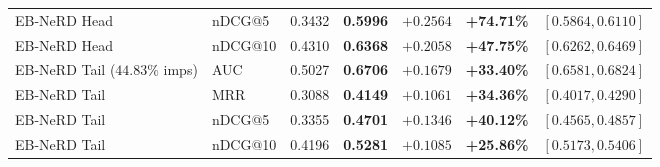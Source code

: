 \documentclass[11pt,a4paper]{article}
\begin{document}
\begin{table}[h!]
\begin{tabularx}{\linewidth}{l l C{1.9cm} C{1.9cm} C{1.5cm} C{1.5cm} C{2.4cm}}
    EB-NeRD Head                   & nDCG@5  & 0.3432 & \textbf{0.5996} & $+0.2564$ & \textbf{+74.71\%} & $[0.5864, 0.6110]$ \\
    EB-NeRD Head                   & nDCG@10 & 0.4310 & \textbf{0.6368} & $+0.2058$ & \textbf{+47.75\%} & $[0.6262, 0.6469]$ \\
    EB-NeRD Tail ($44.83\%$ imps)  & AUC     & 0.5027 & \textbf{0.6706} & $+0.1679$ & \textbf{+33.40\%} & $[0.6581, 0.6824]$ \\
    EB-NeRD Tail                   & MRR     & 0.3088 & \textbf{0.4149} & $+0.1061$ & \textbf{+34.36\%} & $[0.4017, 0.4290]$ \\
    EB-NeRD Tail                   & nDCG@5  & 0.3355 & \textbf{0.4701} & $+0.1346$ & \textbf{+40.12\%} & $[0.4565, 0.4857]$ \\
    EB-NeRD Tail                   & nDCG@10 & 0.4196 & \textbf{0.5281} & $+0.1085$ & \textbf{+25.86\%} & $[0.5173, 0.5406]$ \\
    \bottomrule
  \end{tabularx}
\end{table}
\end{document}
